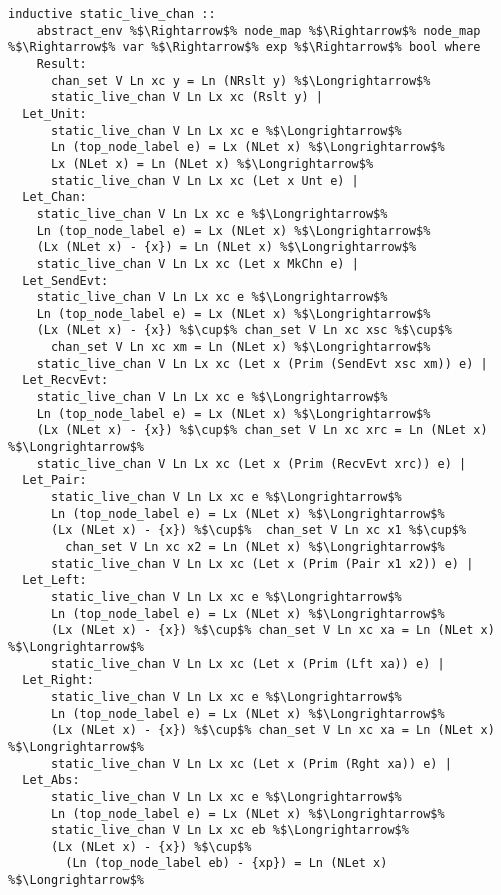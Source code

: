 \documentclass{article}
\begin{document}
\begin{lstlisting}[style=codestyle1, escapechar=\%]
  inductive static_live_chan ::
    abstract_env %$\Rightarrow$% node_map %$\Rightarrow$% node_map %$\Rightarrow$% var %$\Rightarrow$% exp %$\Rightarrow$% bool where
    Result:
      chan_set V Ln xc y = Ln (NRslt y) %$\Longrightarrow$%
      static_live_chan V Ln Lx xc (Rslt y) |
  Let_Unit:
      static_live_chan V Ln Lx xc e %$\Longrightarrow$%
      Ln (top_node_label e) = Lx (NLet x) %$\Longrightarrow$%
      Lx (NLet x) = Ln (NLet x) %$\Longrightarrow$%
      static_live_chan V Ln Lx xc (Let x Unt e) |
  Let_Chan:
    static_live_chan V Ln Lx xc e %$\Longrightarrow$%
    Ln (top_node_label e) = Lx (NLet x) %$\Longrightarrow$%
    (Lx (NLet x) - {x}) = Ln (NLet x) %$\Longrightarrow$%
    static_live_chan V Ln Lx xc (Let x MkChn e) |
  Let_SendEvt:
    static_live_chan V Ln Lx xc e %$\Longrightarrow$%
    Ln (top_node_label e) = Lx (NLet x) %$\Longrightarrow$%
    (Lx (NLet x) - {x}) %$\cup$% chan_set V Ln xc xsc %$\cup$%
      chan_set V Ln xc xm = Ln (NLet x) %$\Longrightarrow$%
    static_live_chan V Ln Lx xc (Let x (Prim (SendEvt xsc xm)) e) |
  Let_RecvEvt:
    static_live_chan V Ln Lx xc e %$\Longrightarrow$%
    Ln (top_node_label e) = Lx (NLet x) %$\Longrightarrow$%
    (Lx (NLet x) - {x}) %$\cup$% chan_set V Ln xc xrc = Ln (NLet x) %$\Longrightarrow$%
    static_live_chan V Ln Lx xc (Let x (Prim (RecvEvt xrc)) e) |
  Let_Pair:
      static_live_chan V Ln Lx xc e %$\Longrightarrow$%
      Ln (top_node_label e) = Lx (NLet x) %$\Longrightarrow$%
      (Lx (NLet x) - {x}) %$\cup$%  chan_set V Ln xc x1 %$\cup$%
        chan_set V Ln xc x2 = Ln (NLet x) %$\Longrightarrow$%
      static_live_chan V Ln Lx xc (Let x (Prim (Pair x1 x2)) e) |
  Let_Left:
      static_live_chan V Ln Lx xc e %$\Longrightarrow$%
      Ln (top_node_label e) = Lx (NLet x) %$\Longrightarrow$%
      (Lx (NLet x) - {x}) %$\cup$% chan_set V Ln xc xa = Ln (NLet x) %$\Longrightarrow$%
      static_live_chan V Ln Lx xc (Let x (Prim (Lft xa)) e) |
  Let_Right:
      static_live_chan V Ln Lx xc e %$\Longrightarrow$%
      Ln (top_node_label e) = Lx (NLet x) %$\Longrightarrow$%
      (Lx (NLet x) - {x}) %$\cup$% chan_set V Ln xc xa = Ln (NLet x) %$\Longrightarrow$%
      static_live_chan V Ln Lx xc (Let x (Prim (Rght xa)) e) |
  Let_Abs:
      static_live_chan V Ln Lx xc e %$\Longrightarrow$%
      Ln (top_node_label e) = Lx (NLet x) %$\Longrightarrow$%
      static_live_chan V Ln Lx xc eb %$\Longrightarrow$%
      (Lx (NLet x) - {x}) %$\cup$%
        (Ln (top_node_label eb) - {xp}) = Ln (NLet x) %$\Longrightarrow$%

\end{lstlisting}
\end{document}
